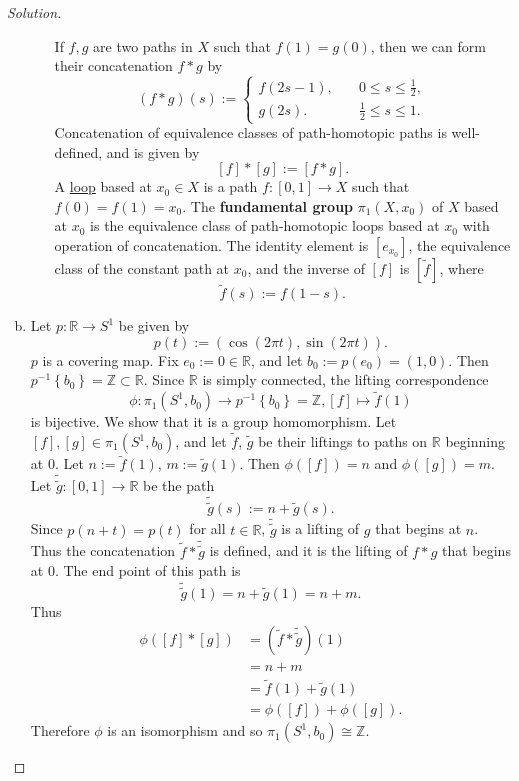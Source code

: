 \documentclass[12pt]{article}
\newcommand{\z}{\mathbb{Z}}
\newcommand{\real}{\mathbb{R}}
\newcommand\inv[1]{#1^{-1}}
\newcommand\paren[1]{\left( #1 \right)}
\newcommand\setb[1]{\left \{ #1 \right \}}
\newcommand{\sqbrack}[1]{\left [ #1 \right ]}
\theoremstyle{definition}
\begin{document}
\begin{proof}[Solution]
\begin{enumerate}[(a)]
\begin{itemize}
            If $f , g$ are two paths in $X$ such that $f(1) = g(0)$, then we can form their concatenation $f \ast g$ by 
            \[
                (f \ast g)(s) := 
                \begin{cases}
                    f(2s-1) , & \quad 0 \leq s \leq \frac{1}{2} , \\
                    g(2s) . & \quad \frac{1}{2} \leq s \leq 1.
                \end{cases}
            \]
            Concatenation of equivalence classes of path-homotopic paths is well-defined, and is given by 
            \[
                [f] \ast [g] := [f \ast g].
            \]
            A \underline{loop} based at $x_0 \in X$ is a path $f : [0,1] \to X$ such that $f(0) = f(1) = x_0$. The \textbf{fundamental group} $\pi_1(X,x_0)$ of $X$ based at $x_0$ is the equivalence class of path-homotopic loops based at $x_0$ with operation of concatenation. The identity element is $[e_{x_0}]$, the equivalence class of the constant path at $x_0$, and the inverse of $[f]$ is $\sqbrack{ \tilde{f} }$, where 
            \[
                \tilde{f}(s) := f(1-s).
            \]
        \end{itemize}
        \item Let $p : \real \to S^1$ be given by 
        \[
            p(t) := \paren{ \cos(2\pi t) , \sin(2\pi t) }.
        \]
        $p$ is a covering map. Fix $e_0 := 0 \in \real$, and let $b_0 := p(e_0) = (1,0)$. Then $\inv{p} \setb{ b_0 } = \z \subset \real$. Since $\real$ is simply connected, the lifting correspondence
        \[
            \phi : \pi_1(S^1,b_0) \to \inv{p} \setb{ b_0 } = \z, [f] \mapsto \tilde{f}(1)
        \]
        is bijective. We show that it is a group homomorphism. Let $[f] , [g] \in \pi_1(S^1,b_0)$, and let $\tilde{f}$, $\tilde{g}$ be their liftings to paths on $\real$ beginning at $0$. Let $n := \tilde{f}(1)$, $m := \tilde{g}(1)$. Then $\phi \paren{ [f] } = n$ and $\phi \paren{ [g] } = m$. Let $\tilde{\tilde{g}} : [0,1] \to \real$ be the path
        \[
            \tilde{\tilde{g}}(s) := n + \tilde{g}(s).
        \]
        Since $p(n+t) = p(t)$ for all $t \in \real$, $\tilde{\tilde{g}}$ is a lifting of $g$ that begins at $n$. Thus the concatenation $\tilde{f} \ast \tilde{\tilde{g}}$ is defined, and it is the lifting of $f \ast g$ that begins at $0$. The end point of this path is
        \[
            \tilde{\tilde{g}}(1) = n + \tilde{g}(1) = n + m.
        \]
        Thus 
        \begin{align*}
            \phi \paren{ [f] \ast [g] } & = \paren{ \tilde{f} \ast \tilde{\tilde{g}} }(1) \\
            & =  n + m \\
            & = \tilde{f}(1) + \tilde{g}(1) \\
            & = \phi \paren{ [f] } + \phi \paren{ [g] }.
        \end{align*}
        Therefore $\phi$ is an isomorphism and so $\pi_1(S^1,b_0) \cong \z$.
    \end{enumerate}
\end{proof}
\end{document}
